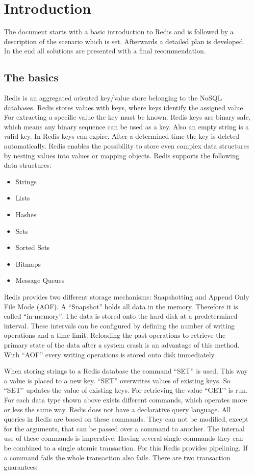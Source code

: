 \chapter{Introduction}

The document starts with a basic introduction to Redis and is followed by a description of the scenario which is set. Afterwards a detailed plan is developed. In the end all solutions are presented with a final recommendation.

\section{The basics}
Redis is an aggregated oriented key/value store belonging to the NoSQL databases. Redis stores values with keys, where keys identify the assigned value. For extracting a specific value the key must be known. Redis keys are binary safe, which means any binary sequence can be used as a key. Also an empty string is a valid key. In Redis keys can expire. After a determined time the key is deleted automatically. Redis enables the possibility to store even complex data structures by nesting values into values or mapping objects. Redis supports the following data structures:

\begin{itemize} 
	\item Strings
	\item Lists
	\item Hashes
	\item Sets
	\item Sorted Sets
\item 	Bitmaps
	\item Message Queues
\end{itemize}

Redis provides two different storage mechanisms: Snapshotting and Append Only File Mode (AOF). A “Snapshot” holds all data in the memory. Therefore it is called “in-memory”. The data is stored onto the hard disk at a predetermined interval. These intervals can be configured by defining the number of writing operations and a time limit. Reloading the past operations to retrieve the primary state of the data after a system crash is an advantage of this method. With “AOF” every writing operations is stored onto disk immediately.

When storing strings to a Redis database the command “SET” is used. This way a value is placed to a new key. “SET” overwrites values of existing keys. So “SET” updates the value of existing keys. For retrieving the value “GET” is run. For each data type shown above exists different commands, which operates more or less the same way. Redis does not have a declarative query language. All queries in Redis are based on these commands. They can not be modified, except for the arguments, that can be passed over a command to another. The internal use of these commands is imperative. Having several single commands they can be combined to a single atomic transaction. For this Redis provides pipelining. If a command fails the whole transaction also fails. There are two transaction guarantees:

